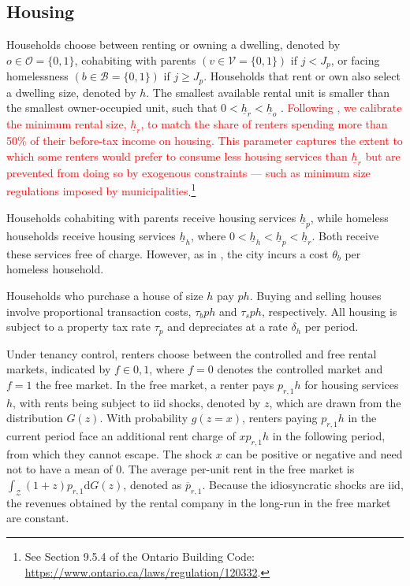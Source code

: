 \documentclass[parskip=full]{article}
\begin{document}
\subsection{Housing}\label{subsection:housing_choice}

Households choose between renting or owning a dwelling, denoted by $o \in \mathcal{O}=\{0,1\}$, cohabiting with parents $\left(v \in \mathcal{V}=\{0,1\}\right)$ if $j<J_{p}$, or facing homelessness $\left(b \in \mathcal{B}=\{0,1\}\right)$ if $j \geq J_{p}$. Households that rent or own also select a dwelling size, denoted by $h$. The smallest available rental unit is smaller than the smallest owner-occupied unit, such that $0<\underline{h}_{r}<\underline{h}_{o}$ \citep{gervais,sommeretal-2013,sommersullivan-2017,kaplanetal-2019,rs-2023}. \textcolor{red}{Following \citet{rs-2023}, we calibrate the minimum rental size, $\underline{h}_{r}$, to match the share of renters spending more than 50\% of their before-tax income on housing. This parameter captures the extent to which some renters would prefer to consume less housing services than $\underline{h}_{r}$ but are prevented from doing so by exogenous constraints — such as minimum size regulations imposed by municipalities}.\footnote{See Section 9.5.4 of the Ontario Building Code: \url{https://www.ontario.ca/laws/regulation/120332}.}

Households cohabiting with parents receive housing services $\underline{h}_{p}$, while homeless households receive housing services $\underline{h}_{h}$, where $0<\underline{h}_{h}<\underline{h}_{p}<\underline{h}_{r}$. Both receive these services free of charge. However, as in \citet{abramson-2024}, the city incurs a cost $\theta_{b}$ per homeless household. 

Households who purchase a house of size $h$ pay $p h$. Buying and selling houses involve proportional transaction costs, $\tau_{b} p h$ and $\tau_{s} p h$, respectively. All housing is subject to a property tax rate $\tau_{p}$ and depreciates at a rate $\delta_h$ per period.

Under tenancy control, renters choose between the controlled and free rental markets, indicated by $f \in {0,1}$, where $f=0$ denotes the controlled market and $f=1$ the free market. In the free market, a renter pays $p_{r,1} h$ for housing services $h$, with rents being subject to iid shocks, denoted by $z$, which are drawn from the distribution $G(z)$. With probability $g(z=x)$, renters paying $p_{r,1}h$ in the current period face an additional rent charge of $x p_{r,1}h$ in the following period, from which they cannot escape. The shock $x$ can be positive or negative and need not to have a mean of 0. The average per-unit rent in the free market is $\int_\mathcal{Z}(1+z)p_{r,1}\mathrm{d}G(z)$, denoted as $\overline{p}_{r,1}$. Because the idiosyncratic shocks are iid, the revenues obtained by the rental company in the long-run in the free market are constant.
\end{document}
